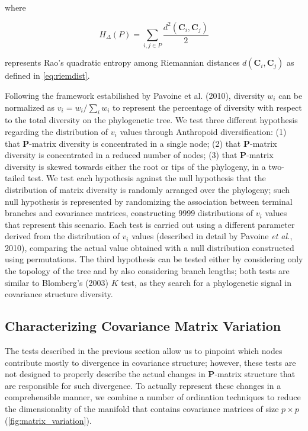 \documentclass[12pt,twoside]{report}
\begin{document}
where

\begin{equation}
H_{\Delta} (P) = \sum_{i,j \in P} \frac{d^2(\mathbf{C}_i, \mathbf{C}_j)}{2}
\label{eq:rao}
\end{equation}

represents Rao's quadratic entropy among Riemannian distances
$d(\mathbf{C}_i, \mathbf{C}_j)$ as defined in \autoref{eq:riemdist}.

Following the framework estabilished by Pavoine et al. (2010), diversity
$w_i$ can be normalized as $v_i = w_i / \sum_i w_i$ to represent the
percentage of diversity with respect to the total diversity on the
phylogenetic tree. We test three different hypothesis regarding the
distribution of $v_i$ values through Anthropoid diversification: (1)
that $\mathbf{P}$-matrix diversity is concentrated in a single node; (2)
that $\mathbf{P}$-matrix diversity is concentrated in a reduced number
of nodes; (3) that $\mathbf{P}$-matrix diversity is skewed towards
either the root or tips of the phylogeny, in a two-tailed test. We test
each hypothesis against the null hypothesis that the distribution of
matrix diversity is randomly arranged over the phylogeny; such null
hypothesis is represented by randomizing the association between
terminal branches and covariance matrices, constructing $9999$
distributions of $v_i$ values that represent this scenario. Each test is
carried out using a different parameter derived from the distribution of
$v_i$ values (described in detail by Pavoine \emph{et al.}, 2010),
comparing the actual value obtained with a null distribution constructed
using permutations. The third hypothesis can be tested either by
considering only the topology of the tree and by also considering branch
lengths; both tests are similar to Blomberg's (2003) $K$ test, as they
search for a phylogenetic signal in covariance structure diversity.

\subsection{Characterizing Covariance Matrix
Variation}\label{characterizing-covariance-matrix-variation}

The tests described in the previous section allow us to pinpoint which
nodes contribute mostly to divergence in covariance structure; however,
these tests are not designed to properly describe the actual changes in
$\mathbf{P}$-matrix structure that are responsible for such divergence.
To actually represent these changes in a comprehensible manner, we
combine a number of ordination techniques to reduce the dimensionality
of the manifold that contains covariance matrices of size $p \times p$
(\autoref{fig:matrix_variation}).
\end{document}
